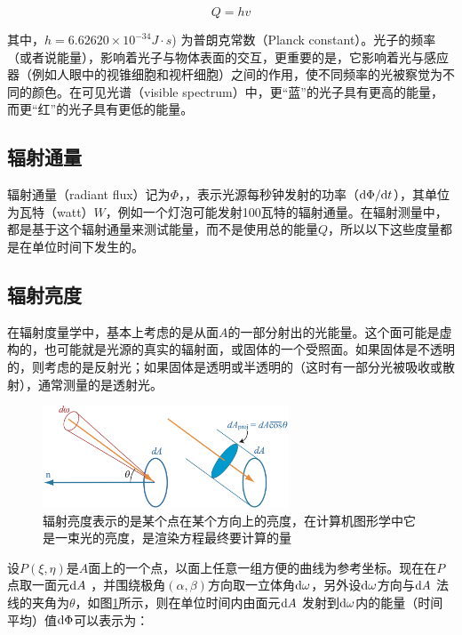 \begin{equation}
	Q=hv
\end{equation}

\noindent 其中，$h=6.62620\times 10^{-34} J\cdot s$) 为普朗克常数（Planck constant）。光子的频率（或者说能量），影响着光子与物体表面的交互，更重要的是，它影响着光与感应器（例如人眼中的视锥细胞和视杆细胞）之间的作用，使不同频率的光被察觉为不同的颜色。在可见光谱（visible spectrum）中，更“蓝”的光子具有更高的能量，而更“红”的光子具有更低的能量。 



\subsection{辐射通量} 
辐射通量（radiant flux）记为$\Phi$，，表示光源每秒钟发射的功率（${\rm d}\Phi/{\rm d}t$），其单位为瓦特（watt）$W$，例如一个灯泡可能发射100瓦特的辐射通量。在辐射测量中，都是基于这个辐射通量来测试能量，而不是使用总的能量$Q$，所以以下这些度量都是在单位时间下发生的。





\subsection{辐射亮度} 
在辐射度量学中，基本上考虑的是从面$A$的一部分射出的光能量。这个面可能是虚构的，也可能就是光源的真实的辐射面，或固体的一个受照面。如果固体是不透明的，则考虑的是反射光；如果固体是透明或半透明的（这时有一部分光被吸收或散射），通常测量的是透射光。

\begin{figure}
\sidecaption
	\includegraphics[width=0.65\textwidth]{figures/intro/radiance}
	\caption{辐射亮度表示的是某个点在某个方向上的亮度，在计算机图形学中它是一束光的亮度，是渲染方程最终要计算的量}
	\label{f:intro-radiance}
\end{figure}

设$P(\xi,\eta)$是$A$面上的一个点，以面上任意一组方便的曲线为参考坐标。现在在$P$点取一面元${\rm d}A$ ，并围绕极角$(\alpha,\beta)$方向取一立体角${\rm d}\omega$，另外设${\rm d}\omega$方向与${\rm d}A$ 法线的夹角为$\theta$，如图\ref{f:intro-radiance}所示，则在单位时间内由面元${\rm d}A$ 发射到${\rm d}\omega$内的能量（时间平均）值${\rm d}\Phi$可以表示为：

